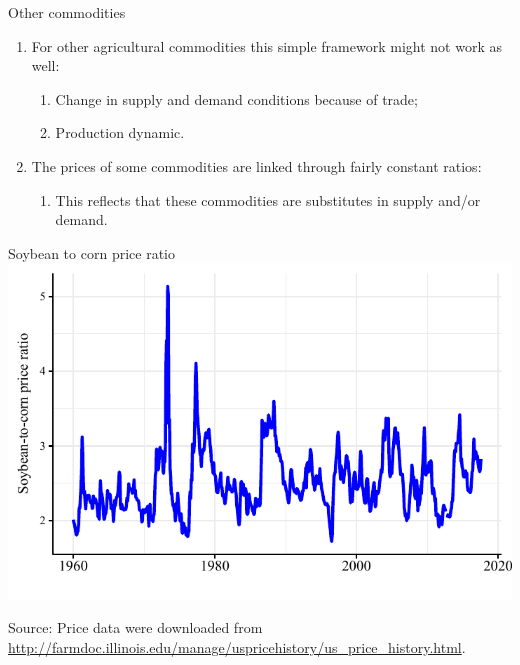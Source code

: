 \documentclass[table,xcolor=pdftex,dvipsnames, handout]{beamer}\usepackage[]{graphicx}\usepackage[]{color}
\makeatletter
\def\maxwidth{ %
  \ifdim\Gin@nat@width>\linewidth
    \linewidth
  \else
    \Gin@nat@width
  \fi
}
\newenvironment{knitrout}{}{} %
\makeatother
\begin{document}
\begin{frame}{Other commodities}
\begin{enumerate}[label=\textbullet]
  \item For other agricultural commodities this simple framework might not work as well:
        \begin{enumerate}[label=-]
            \item Change in supply and demand conditions because of trade;
            \item Production dynamic.
        \end{enumerate}
  \item The prices of some commodities are linked through fairly constant ratios:
        \begin{enumerate}[label=-]
            \item This reflects that these commodities are substitutes in supply and/or demand.
        \end{enumerate}
\end{enumerate}
\end{frame}



\begin{frame}{Soybean to corn price ratio}
\begin{knitrout}
\color{fgcolor}
\includegraphics[width=\maxwidth]{figure/figure_ratio-1} 

\end{knitrout}
\scriptsize
Source: Price data were downloaded from \url{http://farmdoc.illinois.edu/manage/uspricehistory/us_price_history.html}.
\end{frame}
\end{document}
